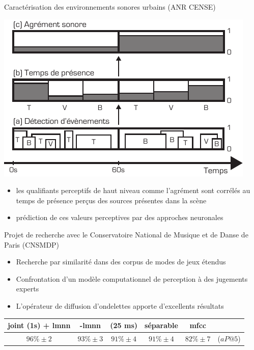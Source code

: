 \begin{frame}{Caractérisation des environnements sonores urbains (ANR CENSE)}
\begin{center}
\includegraphics[width=.4\columnwidth]{figures/block} \\
\end{center}
\begin{itemize}
\item les qualifiants perceptifs de haut niveau comme l'agrément sont corrélés au temps de présence perçus des sources présentes dans la scène
\item prédiction de ces valeurs perceptives par des approches neuronales
\end{itemize}

\end{frame}

\begin{frame}{Projet de recherche avec le Conservatoire National de Musique et de Danse de Paris (CNSMDP)}
\begin{itemize}
\item Recherche par similarité dans des corpus de modes de jeux étendus
\item Confrontation d'un modèle computationnel de perception à des jugements experts
\item L'opérateur de diffusion d'ondelettes apporte d'excellents résultats
\end{itemize}
\begin{table}
\small
    \centering

\begin{tabular}{c|ccccc}
 joint (1s) + lmnn & -lmnn & (25 ms) &  séparable & mfcc & \\
      \hline
 $96\% \pm 2$ & $93\% \pm 3$ & $91\% \pm 4$ & $91\% \pm 4$ & $82\% \pm 7$ & ($aP@5$)\\
\end{tabular}
\end{table}

\end{frame}


